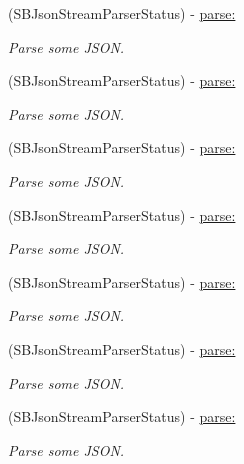 \begin{DoxyCompactItemize}
\item 
(\-S\-B\-Json\-Stream\-Parser\-Status) -\/ \hyperlink{interface_s_b_json_stream_parser_a9c4b15221e738a1eb49079e266daa1bf}{parse\-:}
\begin{DoxyCompactList}\small\item\em \-Parse some \-J\-S\-O\-N. \end{DoxyCompactList}\item 
(\-S\-B\-Json\-Stream\-Parser\-Status) -\/ \hyperlink{interface_s_b_json_stream_parser_a9c4b15221e738a1eb49079e266daa1bf}{parse\-:}
\begin{DoxyCompactList}\small\item\em \-Parse some \-J\-S\-O\-N. \end{DoxyCompactList}\item 
(\-S\-B\-Json\-Stream\-Parser\-Status) -\/ \hyperlink{interface_s_b_json_stream_parser_a9c4b15221e738a1eb49079e266daa1bf}{parse\-:}
\begin{DoxyCompactList}\small\item\em \-Parse some \-J\-S\-O\-N. \end{DoxyCompactList}\item 
(\-S\-B\-Json\-Stream\-Parser\-Status) -\/ \hyperlink{interface_s_b_json_stream_parser_a9c4b15221e738a1eb49079e266daa1bf}{parse\-:}
\begin{DoxyCompactList}\small\item\em \-Parse some \-J\-S\-O\-N. \end{DoxyCompactList}\item 
(\-S\-B\-Json\-Stream\-Parser\-Status) -\/ \hyperlink{interface_s_b_json_stream_parser_a9c4b15221e738a1eb49079e266daa1bf}{parse\-:}
\begin{DoxyCompactList}\small\item\em \-Parse some \-J\-S\-O\-N. \end{DoxyCompactList}\item 
(\-S\-B\-Json\-Stream\-Parser\-Status) -\/ \hyperlink{interface_s_b_json_stream_parser_a9c4b15221e738a1eb49079e266daa1bf}{parse\-:}
\begin{DoxyCompactList}\small\item\em \-Parse some \-J\-S\-O\-N. \end{DoxyCompactList}\item 
(\-S\-B\-Json\-Stream\-Parser\-Status) -\/ \hyperlink{interface_s_b_json_stream_parser_a9c4b15221e738a1eb49079e266daa1bf}{parse\-:}
\begin{DoxyCompactList}\small\item\em \-Parse some \-J\-S\-O\-N. \end{DoxyCompactList}\item 

\end{DoxyCompactItemize}
